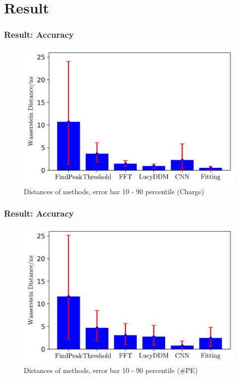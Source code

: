 \documentclass{beamer}
\begin{document}
\section{Result}
\begin{frame}
\frametitle{Result: Accuracy}
\begin{figure}
    \centering
    \caption{Distances of methods, error bar 10 - 90 percentile (Charge)}
    \includegraphics[width=1.0\linewidth]{img/summarycharge.png}
\end{figure}
\end{frame}

\begin{frame}
\frametitle{Result: Accuracy}
\begin{figure}
    \centering
    \caption{Distances of methods, error bar 10 - 90 percentile (\#PE)}
    \includegraphics[width=1.0\linewidth]{img/summarypenum.png}
\end{figure}
\end{frame}
\end{document}
